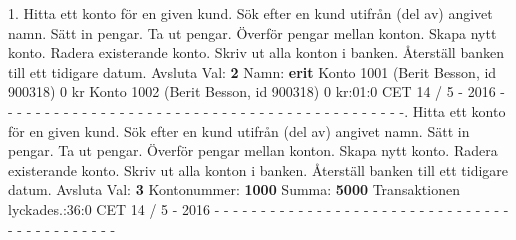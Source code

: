 1.   Hitta ett konto för en given kund.   Sök efter en kund utifrån (del av) angivet namn.   Sätt in pengar.   Ta ut pengar.   Överför pengar mellan konton.   Skapa nytt konto.   Radera existerande konto.   Skriv ut alla konton i banken.   Återställ banken till ett tidigare datum. Avsluta\newline
Val: \textbf{2}\newline
Namn: \textbf{erit}\newline
Konto 1001 (Berit Besson, id 900318) 0 kr\newline
Konto 1002 (Berit Besson, id 900318) 0 kr:01:0 CET 14 / 5 - 2016\newline
- - - - - - - - - - - - - - - - - - - - - - - - - - - - - - - - - - - - - - - - - - - -.   Hitta ett konto för en given kund.   Sök efter en kund utifrån (del av) angivet namn.   Sätt in pengar.   Ta ut pengar.   Överför pengar mellan konton.   Skapa nytt konto.   Radera existerande konto.   Skriv ut alla konton i banken.   Återställ banken till ett tidigare datum. Avsluta\newline
Val: \textbf{3}\newline
Kontonummer: \textbf{1000}\newline
Summa: \textbf{5000}\newline
Transaktionen lyckades.:36:0 CET 14 / 5 - 2016\newline
\newline
- - - - - - - - - - - - - - - - - - - - - - - - - - - - - - - - - - - - - - - - - - - -\newline
